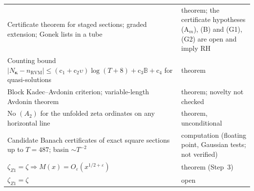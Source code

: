 \documentclass[11pt,reqno]{amsart}
\numberwithin{equation}{section}
\theoremstyle{plain}
\theoremstyle{definition}
\theoremstyle{remark}
\newcommand{\eps}{\varepsilon}
\newcommand{\RVM}{\mathrm{RVM}}
\begin{document}
\begin{longtable}{p{}p{}}
Certificate theorem for staged sections; graded extension; Gonek lists in a tube & theorem; the certificate hypotheses (A$_m$), (B) and (G1), (G2) are open and imply RH\\
Counting bound $|N_{\boldsymbol\kappa}-n_{\RVM}|\le(\mathrm c_1+\mathrm c_2\upsilon)\log(T+8)+\mathrm c_3\mathbb B+\mathrm c_4$ for quasi-solutions & theorem\\
Block Kadec--Avdonin criterion; variable-length Avdonin theorem & theorem; novelty not checked\\
No $(A_2)$ for the unfolded zeta ordinates on any horizontal line & theorem, unconditional\\
Candidate Banach certificates of exact square sections up to $T=487$; basin $\sim T^{-2}$ & computation (floating point, Gaussian tests; not verified)\\
$\zeta_{Z1}=\zeta\Rightarrow M(x)=O_\eps(x^{1/2+\eps})$ & theorem (Step~3)\\
$\zeta_{Z1}=\zeta$ & open\\
\end{longtable}
\endgroup
\end{document}
